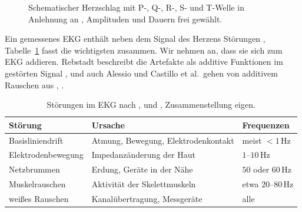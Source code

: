 \documentclass[a4paper,11pt,bibliography=totoc,listof=totoc,headinclude=true,cleardoublepage=empty,oneside]{scrbook}
\theoremstyle{plain}
\theoremstyle{definition}
\begin{document}
\begin{figure}[htbp]
  \centering
  \caption[Schematischer Herzschlag]{Schematischer Herzschlag mit P-, Q-, R-,
  S- und T-Welle in Anlehnung an \cite[Abb.~2.2]{rebstadt}, Amplituden und
  Dauern frei gewählt.}
  \label{fig:muster}
\end{figure}

Ein gemessenes EKG enthält neben dem Signal des Herzens Störungen
\cite[Abschn.~1]{castillo}, %
Tabelle~\ref{tab:stoerungen} fasst die wichtigsten zusammen. Wir nehmen an,
dass sie sich zum EKG addieren. Rebstadt beschreibt die Artefakte als additive Funktionen im
gestörten Signal \cite[Kap.~2.3.1]{rebstadt}, %
und auch Alessio und Castillo et al.\ gehen von additivem Rauschen aus
\cite[Kap.~15.2.1]{alessio}, %
\cite[Abschn.~2.2.2, Gl.~(8)]{castillo}. %

\begin{table}[htbp]
  \centering
  \small
  \begin{tabular}{@{}lll@{}}
    \toprule
    Störung & Ursache & Frequenzen \\
    \midrule
    Basisliniendrift & Atmung, Bewegung, Elektrodenkontakt
        & meist $< 1$\,Hz \\
    Elektrodenbewegung & Impedanzänderung der Haut
        & $1$--$10$\,Hz \\
    Netzbrummen & Erdung, Geräte in der Nähe
        & $50$ oder $60$\,Hz \\
    Muskelrauschen & Aktivität der Skelettmuskeln
        & etwa $20$--$80$\,Hz \\
    wei\ss es Rauschen & Kanalübertragung, Messgeräte
        & alle \\
    \bottomrule
  \end{tabular}
   \caption[Störungen im EKG]{Störungen im EKG nach
  \cite[Kap.~6.5]{sornmo}, %
  \cite[Kap.~2.3, 2.4.3]{gacek} %
  und \cite[Kap.~2.1]{rebstadt}, %
  Zusammenstellung eigen.}
  \label{tab:stoerungen}
\end{table}
\end{document}
